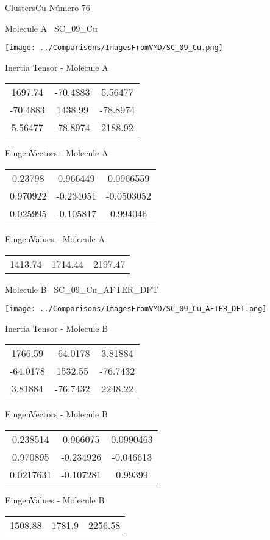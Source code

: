 \vtab[-3cm]
\begin{center}
{\large ClustersCu \tab Número 76}
\end{center}
\begin{multicols}{2}
\begin{center}

Molecule A \
SC\_09\_Cu

\texttt{[image: ../Comparisons/ImagesFromVMD/SC\_09\_Cu.png]}

Inertia Tensor - Molecule A \\
\begin{tabular}{|c c c|}
1697.74	 & 	-70.4883	 & 	5.56477	 \\
-70.4883	 & 	1438.99	 & 	-78.8974	 \\
5.56477	 & 	-78.8974	 & 	2188.92
\end{tabular}

\vtab
 EingenVectors - Molecule A     \\
\begin{tabular}{|c c c|}
0.23798	 & 	0.966449	 & 	0.0966559	 \\
0.970922	 & 	-0.234051	 & 	-0.0503052	 \\
0.025995	 & 	-0.105817	 & 	0.994046
\end{tabular}

\vtab
 EingenValues - Molecule A     \\
\begin{tabular}{|c c c|}
1413.74	 & 	1714.44	 & 	2197.47	 \\
\end{tabular}
\columnbreak

Molecule B \
SC\_09\_Cu\_AFTER\_DFT

\texttt{[image: ../Comparisons/ImagesFromVMD/SC\_09\_Cu\_AFTER\_DFT.png]}

Inertia Tensor - Molecule B \\
\begin{tabular}{|c c c|}
1766.59	 & 	-64.0178	 & 	3.81884	 \\
-64.0178	 & 	1532.55	 & 	-76.7432	 \\
3.81884	 & 	-76.7432	 & 	2248.22
\end{tabular}

\vtab
 EingenVectors - Molecule B     \\
\begin{tabular}{|c c c|}
0.238514	 & 	0.966075	 & 	0.0990463	 \\
0.970895	 & 	-0.234926	 & 	-0.046613	 \\
0.0217631	 & 	-0.107281	 & 	0.99399
\end{tabular}

\vtab
 EingenValues - Molecule B     \\
\begin{tabular}{|c c c|}
1508.88	 & 	1781.9	 & 	2256.58	 \\
\end{tabular}

\end{center}
\end{multicols}


